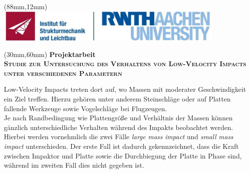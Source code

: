 \begin{textblock*}{110mm}(88mm,12mm)
\includegraphics*[height=16mm]{./pictures/rwth_sla}
\end{textblock*}
%
\begin{textblock*}{\textwidth}(30mm,60mm)
\centering
{\bfseries Projektarbeit} \\[1ex]
\bfseries\scshape Studie zur Untersuchung des Verhaltens von Low-Velocity Impacts unter verschiedenen Parametern\par
\end{textblock*}
\vspace*{40mm}
Low-Velocity Impacts treten dort auf, wo Massen mit moderater Geschwindigkeit ein Ziel treffen. Hierzu gehören unter anderem Steinschläge oder auf Platten fallende Werkzeuge sowie Vogelschläge bei Flugzeugen. \\
Je nach Randbedingung wie Plattengröße und Verhältnis der Massen können gänzlich unterschiedliche Verhalten während des Impakts beobachtet werden. Hierbei werden vornehmlich die zwei Fälle \textit{large mass impact} und \textit{small mass impact} unterschieden. Der erste Fall ist dadurch gekennzeichnet, dass die Kraft zwischen Impaktor und Platte sowie die Durchbiegung der Platte in Phase sind, während im zweiten Fall dies nicht gegeben ist. \\
